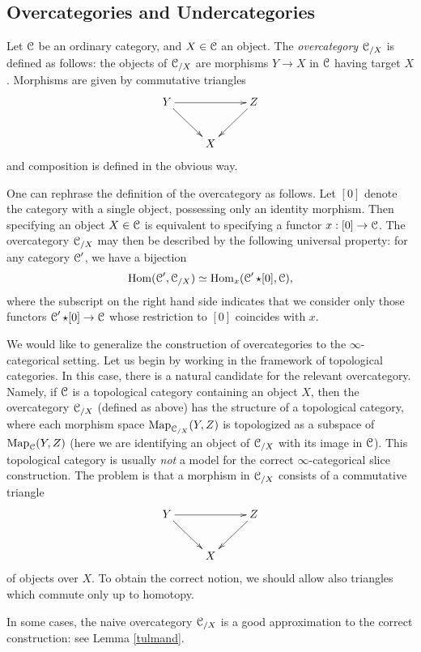 \begin{Didn't Read}
\subsection{Overcategories and Undercategories}\label{slices}

Let $\operatorname{\mathcal{C}}$ be an ordinary category, and $X \in \operatorname{\mathcal{C}}$ an object.
The {\it overcategory} $\operatorname{\mathcal{C}}_{/X}$ is defined as follows:
the objects of $\operatorname{\mathcal{C}}_{/X}$ are
morphisms $Y \rightarrow X$ in $\operatorname{\mathcal{C}}$ having target $X$.
Morphisms are given by commutative triangles
$$\xymatrix{ Y \ar[dr] \ar[rr] & & Z \ar[dl] \\
& X }$$
and composition is defined in the obvious way.

One can rephrase the definition of the overcategory as follows.
Let $[0]$ denote the category with a single object, possessing
only an identity morphism. Then specifying an object $X \in \operatorname{\mathcal{C}}$
is equivalent to specifying a functor $x: [0] \rightarrow
\operatorname{\mathcal{C}}$. The overcategory $\operatorname{\mathcal{C}}_{/X}$ may then be described by
the following universal property: for any category $\operatorname{\mathcal{C}}'$, we
have a bijection
$$ \operatorname{Hom}(\operatorname{\mathcal{C}}', \operatorname{\mathcal{C}}_{/X}) \simeq \operatorname{Hom}_{x}(\operatorname{\mathcal{C}}' \star [0],
\operatorname{\mathcal{C}}),$$ where the subscript on the right hand side indicates
that we consider only those functors $\operatorname{\mathcal{C}}' \star [0]
\rightarrow \operatorname{\mathcal{C}}$ whose restriction to $[0]$ coincides with
$x$.

We would like to generalize the construction of overcategories to the $\infty$-categorical setting. 
Let us begin by working in the framework of topological categories. In this case, there is a natural candidate for the relevant overcategory. Namely, if $\operatorname{\mathcal{C}}$ is a topological category containing an object $X$, then the overcategory $\operatorname{\mathcal{C}}_{/X}$ (defined as above) has the structure of a topological category, where each morphism space $\operatorname{{Map}}_{ \operatorname{\mathcal{C}}_{/X} }(Y,Z)$ is topologized as a subspace
of $\operatorname{{Map}}_{\operatorname{\mathcal{C}}}(Y,Z)$ (here we are identifying an object of $\operatorname{\mathcal{C}}_{/X}$ with its image in $\operatorname{\mathcal{C}}$). This topological category is usually {\em
not} a model for the correct $\infty$-categorical slice
construction. The problem is that a morphism in $\operatorname{\mathcal{C}}_{/X}$ consists
of a commutative triangle
$$\xymatrix{ Y \ar[dr] \ar[rr] & & Z \ar[dl] \\
& X }$$
of objects over $X$. To obtain the correct notion, we should allow also
triangles which commute only up to homotopy. 

\begin{remark}
In some cases, the naive overcategory $\operatorname{\mathcal{C}}_{/X}$ is a good approximation
to the correct construction: see Lemma \ref{tulmand}.
\end{remark}


\end{Didn't Read}
